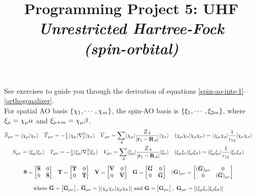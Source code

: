 \documentclass[fleqn]{article}
\title{Programming Project 5: UHF\\
\textit{Unrestricted Hartree-Fock\\(spin-orbital)}}
\author{}
\date{}
\begin{document}
\maketitle
\vspace{-1cm}
\noindent
See exercises to guide you through the derivation of equations \ref{spin-ao-ints-1}--\ref{orthogonalizer}.\\

\noindent
{}
For spatial AO basis $\{\chi_1,\cdots,\chi_m\}$, the spin-AO basis is $\{\xi_1,\cdots,\xi_{2m}\}$, where $\xi_\mu=\chi_\mu\alpha$ and $\xi_{\mu+m}=\chi_\mu\beta$.
\begin{gather}
\begin{aligned}
\label{space-ao-ints}
&
  \overline{S}_{\mu\nu}
=
  \langle\chi_{\mu}|\chi_{\nu}\rangle
&&
  \overline{T}_{\mu\nu}
=
  -\tfrac{1}{2}\langle\chi_{\mu}|\nabla_1^2|\chi_{\nu}\rangle
&&
  \overline{V}_{\mu\nu}
=
  \sum_A\langle\chi_{\mu}|\dfrac{Z_A}{|\mathbf{r}_1-\mathbf{R}_A|}|\chi_{\nu}\rangle
&&
  (\chi_\mu\chi_\nu|\chi_\rho\chi_\sigma)
=
  \langle\chi_\mu\chi_\rho|\dfrac{1}{r_{12}}|\chi_\nu\chi_\sigma\rangle
\end{aligned}\\
\begin{aligned}
\label{spin-ao-ints}
&
  S_{\mu\nu}
=
  \langle\xi_{\mu}|\xi_{\nu}\rangle
&&
  T_{\mu\nu}
=
  -\tfrac{1}{2}\langle\xi_{\mu}|\nabla_1^2|\xi_{\nu}\rangle
&&
  V_{\mu\nu}
=
  \sum_A\langle\xi_{\mu}|\dfrac{Z_A}{|\mathbf{r}_1-\mathbf{R}_A|}|\xi_{\nu}\rangle
&&
  (\xi_\mu\xi_\nu|\xi_\rho\xi_\sigma)
=
  \langle\xi_\mu\xi_\rho|\dfrac{1}{r_{12}}|\xi_\nu\xi_\sigma\rangle
\end{aligned}\\[5pt]
\begin{aligned}
\label{spin-ao-ints-1}
&
  \mathbf{S}
=
  \begin{bmatrix}\overline{\mathbf{S}}&0\\0&\overline{\mathbf{S}}\end{bmatrix}
&&
  \mathbf{T}
=
  \begin{bmatrix}\overline{\mathbf{T}}&0\\0&\overline{\mathbf{T}}\end{bmatrix}
&&
  \mathbf{V}
=
  \begin{bmatrix}\overline{\mathbf{V}}&0\\0&\overline{\mathbf{V}}\end{bmatrix}
&&
  \mathbf{G}
=
  \begin{bmatrix}\overline{\mathbf{G}}&0\\0&\overline{\mathbf{G}}\end{bmatrix}
&&
  (\mathbf{G})_{\mu\nu}
=
  \begin{bmatrix}(\overline{\mathbf{G}})_{\mu\nu}&0\\0&(\overline{\mathbf{G}})_{\mu\nu}\end{bmatrix}
\end{aligned}\\[7pt]
\begin{aligned}
\label{spin-ao-ints-2}
&
\text{where}
\
  \overline{\mathbf{G}}
=
  \begin{bmatrix}\overline{\mathbf{G}}_{\mu\nu}\end{bmatrix},
\
  \overline{\mathbf{G}}_{\mu\nu}
=
  [(\chi_\mu\chi_\nu|\chi_\rho\chi_\sigma)]
\
\text{and}
\
  \mathbf{G}
=
  \begin{bmatrix}\mathbf{G}_{\mu\nu}\end{bmatrix},
\
  \mathbf{G}_{\mu\nu}
=
  [(\xi_\mu\xi_\nu|\xi_\rho\xi_\sigma)]
\end{aligned}
\end{gather}
\end{document}
